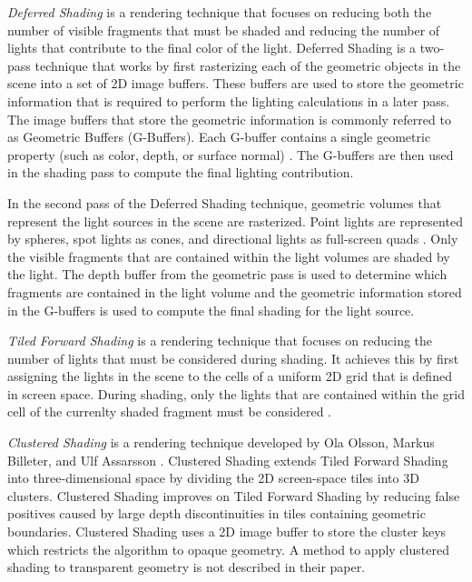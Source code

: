 \emph{Deferred Shading} is a rendering technique that focuses on reducing both the number of visible fragments that must be shaded and reducing the number of lights that contribute to the final color of the light. Deferred Shading is a two-pass technique that works by first rasterizing each of the geometric objects in the scene into a set of 2D image buffers. These buffers are used to store the geometric information that is required to perform the lighting calculations in a later pass. The image buffers that store the geometric information is commonly referred to as Geometric Buffers (G-Buffers). Each G-buffer contains a single geometric property (such as color, depth, or surface normal) \parencite{12_saitotakahashi_1990}. The G-buffers are then used in the shading pass to compute the final lighting contribution.

In the second pass of the Deferred Shading technique, geometric volumes that represent the light sources in the scene are rasterized. Point lights are represented by spheres, spot lights as cones, and directional lights as full-screen quads \parencite{42_hargreaves_harris_2004}. Only the visible fragments that are contained within the light volumes are shaded by the light. The depth buffer from the geometric pass is used to determine which fragments are contained in the light volume and the geometric information stored in the G-buffers is used to compute the final shading for the light source.

\emph{Tiled Forward Shading} is a rendering technique that focuses on reducing the number of lights that must be considered during shading. It achieves this by first assigning the lights in the scene to the cells of a uniform 2D grid that is defined in screen space. During shading, only the lights that are contained within the grid cell of the currenlty shaded fragment must be considered \parencite{13_olssonassarsson_2011}.

\emph{Clustered Shading} is a rendering technique developed by Ola Olsson, Markus Billeter, and Ulf Assarsson \parencite{20_olsson_2012}. Clustered Shading extends Tiled Forward Shading into three-dimensional space by dividing the 2D screen-space tiles into 3D clusters. Clustered Shading improves on Tiled Forward Shading by reducing false positives caused by large depth discontinuities in tiles containing geometric boundaries. Clustered Shading uses a 2D image buffer to store the cluster keys which restricts the algorithm to opaque geometry. A method to apply clustered shading to transparent geometry is not described in their paper.

